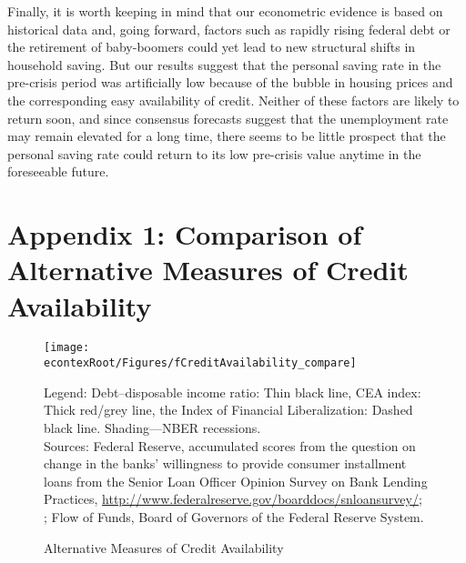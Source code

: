 \documentclass[titlepage]{\econtex}
\begin{document}
Finally, it is worth keeping in mind that our econometric evidence is based on historical data and, going
forward, factors such as rapidly rising federal debt or the retirement
of baby-boomers could yet lead to new structural shifts in household
saving. But our results suggest that the personal saving rate in the
pre-crisis period was artificially low because of the bubble in
housing prices and the corresponding easy availability of credit.
Neither of these factors are likely to return soon, and since
consensus forecasts suggest that the unemployment rate may
remain elevated for a long time, there seems to be little prospect
that the personal saving rate could return to its low pre-crisis value
anytime in the foreseeable future.




\small

%



\clearpage
\section*{Appendix 1: Comparison of Alternative Measures of Credit Availability}


\hypertarget{fCreditAvailability}{}
\begin{figure}
\caption{Alternative Measures of Credit Availability \label{fCreditAvailability}}
\texttt{[image: \\econtexRoot/Figures/fCreditAvailability\_compare]}

\footnotesize
Legend: Debt--disposable income ratio: Thin black line, CEA index: Thick red/grey line, the \cite{abiadEtAl_FinReforms} Index of Financial Liberalization: Dashed black line. Shading---NBER recessions.\\[0mm]
\tiny Sources: Federal Reserve, accumulated scores from the question on change in the banks' willingness to provide consumer installment loans from the Senior Loan Officer Opinion Survey on Bank Lending Practices, \url{http://www.federalreserve.gov/boarddocs/snloansurvey/}; \cite{abiadEtAl_FinReforms}; Flow of Funds, Board of Governors of the Federal Reserve System.
\end{figure}
\end{document}
